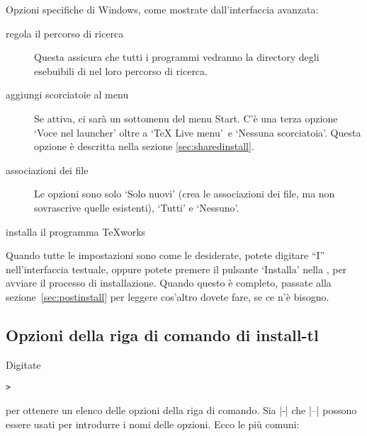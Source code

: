 \documentclass{article}
\begin{document}
Opzioni specifiche di Windows, come mostrate dall'interfaccia \GUI{} avanzata:
\begin{description}
\item[regola il percorso di ricerca] Questa assicura che tutti
  i programmi vedranno la directory degli esebuibili di \TL{} nel loro
  percorso di ricerca.

\item[aggiungi scorciatoie al menu] Se attiva, ci sarà un sottomenu \TL{}
   del menu Start. C'è una terza opzione `Voce nel launcher' oltre a
  `TeX Live menu' e `Nessuna scorciatoia'. Questa opzione è descritta nella
  sezione \ref{sec:sharedinstall}.

\item[associazioni dei file] Le opzioni sono solo `Solo nuovi'
  (crea le associazioni dei file, ma non sovrascrive quelle esistenti),
  `Tutti' e `Nessuno'.

\item[installa il programma \TeX{}works]
\end{description}
Quando tutte le impostazioni sono come le desiderate, potete digitare
``I'' nell'interfaccia testuale, oppure potete premere il pulsante
`Installa' nella \GUI, per avviare il processo di installazione. Quando
questo è completo, passate alla sezione~\ref{sec:postinstall} per leggere
cos'altro dovete fare, se ce n'è bisogno.

\subsection{Opzioni della riga di comando di install-tl}
\label{sec:cmdline}

Digitate
\begin{alltt}
> 
\end{alltt}
per ottenere un elenco delle opzioni della riga di comando. Sia |-| che
|--| possono essere usati per introdurre i nomi delle opzioni. Ecco le più
comuni:
\end{document}
